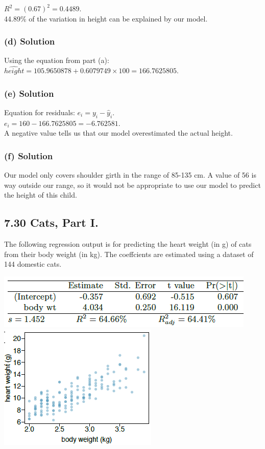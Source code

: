\documentclass[]{article}
\begin{document}
\(R^2 = (0.67)^2 = 0.4489\).\\
44.89\% of the variation in height can be explained by our model.

\subsubsection{(d) Solution}\label{d-solution-1}

Using the equation from part (a):
\(\widehat{height} = 105.9650878 + 0.6079749 \times 100 = 166.7625805\).

\subsubsection{(e) Solution}\label{e-solution}

Equation for residuals: \(e_i = y_i - \hat{y}_i\).\\
\(e_i = 160 - 166.7625805 = -6.762581\).\\
A negative value tells us that our model overestimated the actual
height.

\subsubsection{(f) Solution}\label{f-solution}

Our model only covers shoulder girth in the range of 85-135 cm. A value
of 56 is way outside our range, so it would not be appropriate to use
our model to predict the height of this child.

\subsection{7.30 Cats, Part I.}\label{cats-part-i.}

The following regression output is for predicting the heart weight (in
g) of cats from their body weight (in kg). The coeffcients are estimated
using a dataset of 144 domestic cats.

\includegraphics{7.30a.PNG} \includegraphics{7.30b.PNG}
\end{document}
